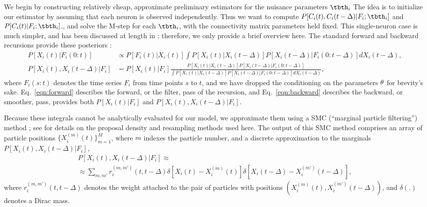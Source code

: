 We begin by constructing relatively cheap, approximate preliminary
estimators for the nuisance parameters $\tbth_i$ 
The idea is to initialize
our estimator by assuming that each neuron is observed independently.
Thus we want to compute $P[C_i(t), C_i(t-\Delta) | F_i; \tbth_i]$
and $P[C_i(t)|F_i;\tbth_i]$., and
solve the M-step for each $\tbth_i$, with
the connectivity matrix parameters held fixed.  This single-neuron case
is much simpler, and has been discussed at length in
\cite{Vogelstein2009}; therefore, we only provide a brief overview
here. The standard forward and backward recursions provide these
posteriors \cite{ShumwayStoffer06}:
\begin{align}
P[X_i(t) | F_i(0:t)] &\propto P[F_i(t)| X_i(t)] \int P[X_i(t) |
    X_i(t-\Delta)] P[X_i(t-\Delta) | F_i(0:t-\Delta)] dX_i(t-\Delta),
\label{eqn:forward} \\
P[X_i(t), X_i(t-\Delta) | F_i] &= P[X_i(t) | F_i]
\frac{P[X_i(t) | X_i(t-\Delta)] P[X_i(t-\Delta) |
F_i(0:t-\Delta)]}{\int P[X_i(t) | X_i(t-\Delta)] P[X_i(t-\Delta) |
F_i(0:t-\Delta)] dX_i(t-\Delta)},
\label{eqn:backward}
\end{align}
where $F_i(s:t)$ denotes the time series $F_i$ from time
points $s$ to $t$, and we have dropped the conditioning on the
parameters $\mathbf{\theta}$ for brevity's sake. Eq.~\eqref{eqn:forward} describes the forward, or the filter, pass of the recursion, and Eq.~\eqref{eqn:backward} describes the backward, or smoother, pass, provides both $P[X_i(t)|F_i]$ and
$P[X_i(t), X_i(t-\Delta) | F_i]$.

Because these integrals cannot
be analytically evaluated for our model, we approximate them using a SMC
(``marginal particle filtering'') method \cite{DGA00,DFG01,GDW04};
see \cite{Vogelstein2009} for details on the proposal density and
resampling methods used here. The output of this SMC method
comprises an array of particle positions $\{X_i^{(m)}(t)\}_{m=1}^{M}$, where $m$
indexes the particle number, and a discrete approximation to the
marginals $P[X_i(t), X_i(t-\Delta) | F_i]$,
\begin{multline}
P[X_i(t), X_i(t-\Delta) | F_i] \approx \\
\approx \sum_{m,m'}
r_i^{(m,m')}(t,t-\Delta) \delta \left[ X_i(t) - X_i^{(m)}(t) \right]
\delta \left[ X_i(t-\Delta) - X_i^{(m')}(t-\Delta) \right],
\label{eqn:particle-fb}
\end{multline}
where $r_i^{(m,m')}(t,t-\Delta)$ denotes the weight attached to the
pair of particles with positions $\left( X_i^{(m)}(t),
X_i^{(m')}(t-\Delta) \right)$, and $\delta(.)$ denotes a Dirac mass.

